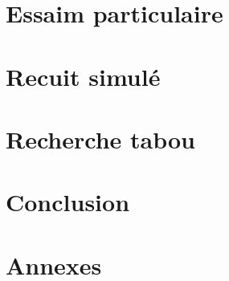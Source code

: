 \documentclass{librairies/lib}
\begin{document}
    


    \newpage

    \section{Essaim particulaire}\label{sec:essaim-particulaire}

    


    \newpage

    \section{Recuit simulé}\label{sec:recuit-simule}

    


    \newpage

    \section{Recherche tabou}\label{sec:recherche-tabou}

    


    \newpage



    \section{Conclusion}\label{sec:conclusion}

    

    \newpage




    \section*{Annexes}





    \printglossaries


    \newpage

    \listoffigures




    \newpage



    
    
\end{document}
